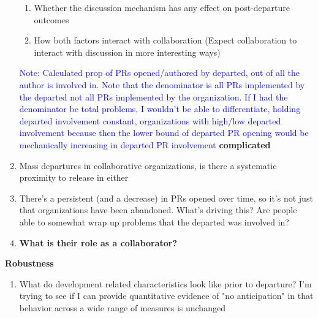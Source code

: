 \documentclass[12pt,notitlepage]{article}
\begin{document}
\begin{enumerate}
\begin{enumerate}
\item Whether the discussion mechanism has any effect on post-departure outcomes
\item How both factors interact with collaboration (Expect collaboration to interact with discussion in more interesting ways)
\end{enumerate}
\textcolor{blue}{Note: Calculated prop of PRs opened/authored by departed, out of all the author is involved in. Note that the denominator is all PRs implemented by the departed not all PRs implemented by the organization. If I had the denominator be total problems, I wouldn't be able to differentiate, holding departed involvement constant, organizations with high/low departed involvement because then the lower bound of departed PR opening would be mechanically increasing in departed PR involvement}
\textbf{complicated}


\item Mass departures in collaborative organizations, is there a systematic proximity to release in either

\item There's a persistent (and a decrease) in PRs opened over time, so it's not just that organizations have been abandoned. What's driving this? Are people able to somewhat wrap up problems that the departed was involved in?
\item \textbf{What is their role as a collaborator?}

\end{enumerate}

\textbf{Robustness}
\begin{enumerate}
\item What do development related characteristics look like prior to departure? I'm trying to see if I can provide quantitative evidence of "no anticipation" in that behavior across a wide range of measures is unchanged
\end{enumerate}

\end{document}
